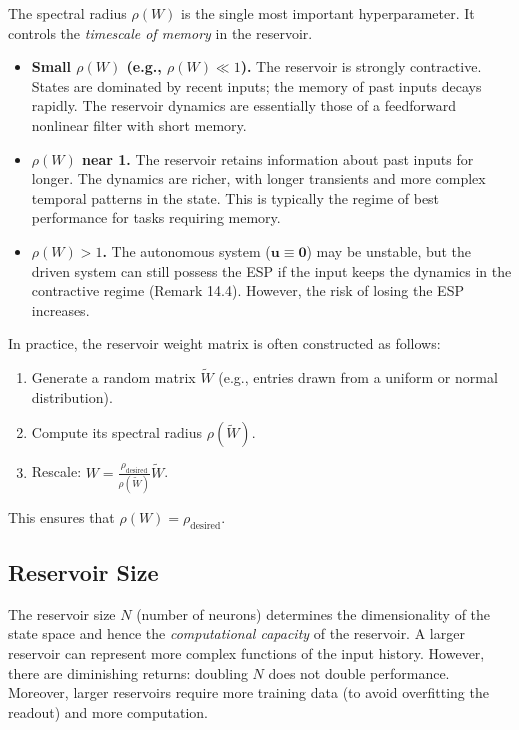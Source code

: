 The spectral radius $\rho(W)$ is the single most important hyperparameter. It controls the \textit{timescale of memory} in the reservoir.

\begin{itemize}[nosep]
  \item \textbf{Small $\rho(W)$ (e.g., $\rho(W) \ll 1$).} The reservoir is strongly contractive. States are dominated by recent inputs; the memory of past inputs decays rapidly. The reservoir dynamics are essentially those of a feedforward nonlinear filter with short memory.

  \item \textbf{$\rho(W)$ near 1.} The reservoir retains information about past inputs for longer. The dynamics are richer, with longer transients and more complex temporal patterns in the state. This is typically the regime of best performance for tasks requiring memory.

  \item \textbf{$\rho(W) > 1$.} The autonomous system ($\mathbf{u} \equiv \mathbf{0}$) may be unstable, but the driven system can still possess the ESP if the input keeps the dynamics in the contractive regime (Remark 14.4). However, the risk of losing the ESP increases.
\end{itemize}

In practice, the reservoir weight matrix is often constructed as follows:

\begin{enumerate}[nosep]
  \item Generate a random matrix $\widetilde{W}$ (e.g., entries drawn from a uniform or normal distribution).
  \item Compute its spectral radius $\rho(\widetilde{W})$.
  \item Rescale: $W = \frac{\rho_{\text{desired}}}{\rho(\widetilde{W})} \widetilde{W}$.
\end{enumerate}

This ensures that $\rho(W) = \rho_{\text{desired}}$.

\subsection{Reservoir Size}\label{sec:14.4.2}

The reservoir size $N$ (number of neurons) determines the dimensionality of the state space and hence the \textit{computational capacity} of the reservoir. A larger reservoir can represent more complex functions of the input history. However, there are diminishing returns: doubling $N$ does not double performance. Moreover, larger reservoirs require more training data (to avoid overfitting the readout) and more computation.

